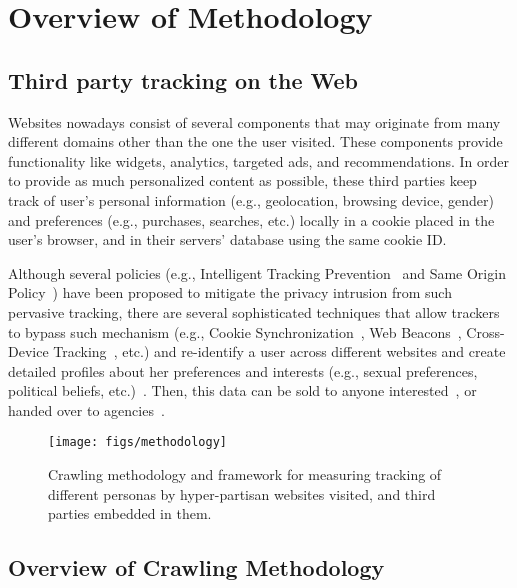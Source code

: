 \documentclass{article}
\begin{document}
\section{Overview of Methodology}\label{sec:method}

\subsection{Third party tracking on the Web}

Websites nowadays consist of several components that may originate from many different domains other than the one the user visited.
These components provide functionality like widgets, analytics, targeted ads, and recommendations.
In order to provide as much personalized content as possible, these third parties keep track of user's personal information (e.g., geolocation, browsing device, gender) and preferences (e.g., purchases, searches, etc.) locally in a cookie placed in the user's browser, and in their servers' database using the same cookie ID.

Although several policies (e.g., Intelligent Tracking Prevention~\cite{itp} and Same Origin Policy~\cite{sop}) have been proposed to mitigate the privacy intrusion from such pervasive tracking, there are several sophisticated techniques that allow trackers to bypass such mechanism (e.g., Cookie Synchronization~\cite{panpap_www2019,bashir2016}, Web Beacons~\cite{harding2001cookies}, Cross-Device Tracking~\cite{solomos2019cdt}, etc.) and re-identify a user across different websites and create detailed profiles about her preferences and interests (e.g., sexual preferences, political beliefs, etc.)~\cite{jernigan2009gaydar}.
Then, this data can be sold to anyone interested~\cite{toysmart}, or handed over to agencies~\cite{nsaCookies}.

\begin{figure}
    \centering
    \texttt{[image: figs/methodology]}
    \caption{Crawling methodology and framework for measuring tracking of different personas by hyper-partisan websites visited, and third parties embedded in them.}
    \label{fig:machinery}
\end{figure}

\subsection{Overview of Crawling Methodology}
\end{document}
